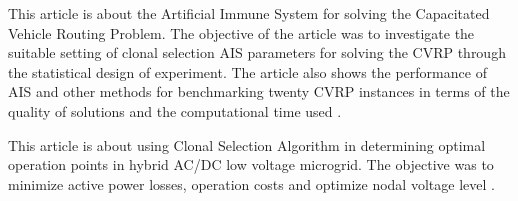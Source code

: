 \documentclass[a4paper]{article}
\begin{document}
This article is about the Artificial Immune System for solving the Capacitated Vehicle Routing Problem. The objective of the article was to investigate the suitable setting of clonal selection AIS parameters for solving the CVRP through the statistical design of experiment. The article also shows the performance of AIS and other methods for benchmarking twenty CVRP instances in terms of the quality of solutions and the computational time used \cite{thapatsuwan}.


This article is about using Clonal Selection Algorithm in determining optimal operation points in hybrid AC/DC low voltage microgrid. The objective was to minimize active power losses, operation costs and optimize nodal voltage level \cite{rokicki}.
\newpage
\printbibliography
\end{document}
